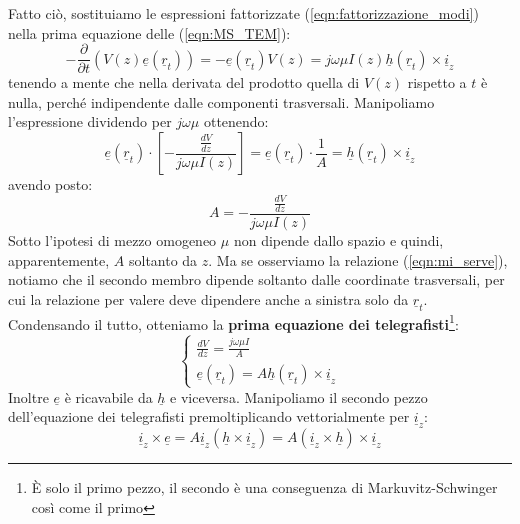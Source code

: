 \documentclass{book}
\begin{document}
    Fatto ciò, sostituiamo le espressioni fattorizzate (\ref{eqn:fattorizzazione_modi}) nella prima equazione delle (\ref{eqn:MS_TEM}):
    \begin{equation}
        -\frac{\partial}{\partial t}(V(z)\underline{e}(\underline{r}_{t})) = - \underline{e}(\underline{r}_{t})V(z) = j \omega \mu I(z)\underline{h}(\underline{r}_{t}) \times \underline{i}_{z}
    \end{equation}
    tenendo a mente che nella derivata del prodotto quella di $V(z)$ rispetto a $t$ è nulla, perché indipendente dalle componenti trasversali.
    Manipoliamo l'espressione dividendo per $j \omega \mu$ ottenendo:
    \begin{equation}
        \label{eqn:mi_serve}
        \underline{e}(\underline{r}_{t}) \cdot [-\frac{\displaystyle \frac{dV}{dz}}{j \omega \mu I(z)}] = \underline{e}(\underline{r}_{t}) \cdot \frac{1}{A}= \underline{h}(\underline{r}_{t}) \times \underline{i}_{z}
    \end{equation}
    avendo posto:
    \begin{equation}
         A = -\frac{\displaystyle \frac{dV}{dz}}{j \omega \mu I(z)}
    \end{equation}
    Sotto l'ipotesi di mezzo omogeneo $\mu$ non dipende dallo spazio e quindi, apparentemente, $A$ soltanto da $z$. Ma se osserviamo
    la relazione (\ref{eqn:mi_serve}), notiamo che il secondo membro dipende soltanto dalle coordinate trasversali, per cui la relazione per valere deve 
    dipendere anche a sinistra solo da $\underline{r}_{t}$.
    Condensando il tutto, otteniamo la \textbf{prima equazione dei telegrafisti}\footnote{È solo il primo pezzo, il secondo è una conseguenza di Markuvitz-Schwinger così come il primo}:
    \begin{equation}
        \label{eqn:prima_eq_telegrafisti}
        \begin{cases}
            \displaystyle \frac{dV}{dz} = \frac{j \omega \mu I}{A} \\
            \underline{e}(\underline{r}_{t}) = A \underline{h}(\underline{r}_{t}) \times \underline{i}_{z}
        \end{cases}
    \end{equation}
    Inoltre $\underline{e}$ è ricavabile da $\underline{h}$ e viceversa. Manipoliamo 
    il secondo pezzo dell'equazione dei telegrafisti premoltiplicando vettorialmente per $\underline{i}_{z}$:
    \begin{equation}
        \underline{i}_{z} \times \underline{e} = A \underline{i}_{z}(\underline{h} \times \underline{i}_{z}) = A (\underline{i}_{z} \times \underline{h}) \times \underline{i}_{z}
    \end{equation}
\end{document}
